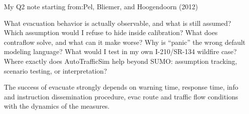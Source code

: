 %
%
%

\iffalse
My Q2 note starting from:Pel, Bliemer, and Hoogendoorn (2012)

What evacuation behavior is actually observable, and what is still assumed?
Which assumption would I refuse to hide inside calibration?
What does contraflow solve, and what can it make worse?
Why is “panic” the wrong default modeling language?
What would I test in my own I-210/SR-134 wildfire case?
Where exactly does AutoTrafficSim help beyond SUMO: assumption tracking, scenario testing, or interpretation?



The success of evacuate strongly depends on warning time, response time, info and instruction dissemination
procedure, evac route and traffic flow conditions with the dynamics of the measures. 


